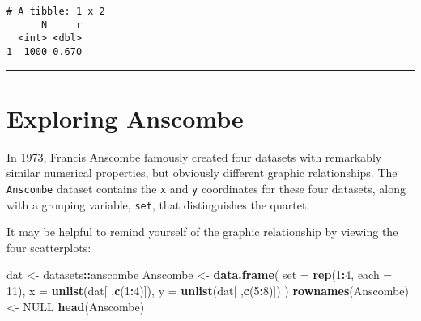 \documentclass[
]{book}
\newenvironment{Shaded}{\begin{snugshade}}{\end{snugshade}}
\newcommand{\CommentTok}[1]{\textcolor[rgb]{0.56,0.35,0.01}{\textit{#1}}}
\newcommand{\DataTypeTok}[1]{\textcolor[rgb]{0.13,0.29,0.53}{#1}}
\newcommand{\DecValTok}[1]{\textcolor[rgb]{0.00,0.00,0.81}{#1}}
\newcommand{\KeywordTok}[1]{\textcolor[rgb]{0.13,0.29,0.53}{\textbf{#1}}}
\newcommand{\NormalTok}[1]{#1}
\newcommand{\OperatorTok}[1]{\textcolor[rgb]{0.81,0.36,0.00}{\textbf{#1}}}
\newcommand{\OtherTok}[1]{\textcolor[rgb]{0.56,0.35,0.01}{#1}}
\newcommand{\StringTok}[1]{\textcolor[rgb]{0.31,0.60,0.02}{#1}}
\begin{document}
\begin{Shaded}
\end{Shaded}

\begin{verbatim}
# A tibble: 1 x 2
      N     r
  <int> <dbl>
1  1000 0.670
\end{verbatim}

\begin{center}\rule{0.5\linewidth}{0.5pt}\end{center}

\hypertarget{exploring-anscombe}{%
\section{Exploring Anscombe}\label{exploring-anscombe}}

In 1973, Francis Anscombe famously created four datasets with remarkably similar numerical properties, but obviously different graphic relationships. The \texttt{Anscombe} dataset contains the \texttt{x} and \texttt{y} coordinates for these four datasets, along with a grouping variable, \texttt{set}, that distinguishes the quartet.

It may be helpful to remind yourself of the graphic relationship by viewing the four scatterplots:

\begin{Shaded}
\begin{Highlighting}[]
\NormalTok{dat <-}\StringTok{ }\NormalTok{datasets}\OperatorTok{::}\NormalTok{anscombe}
\NormalTok{Anscombe <-}\StringTok{ }\KeywordTok{data.frame}\NormalTok{(}
    \DataTypeTok{set  =} \KeywordTok{rep}\NormalTok{(}\DecValTok{1}\OperatorTok{:}\DecValTok{4}\NormalTok{, }\DataTypeTok{each =} \DecValTok{11}\NormalTok{),}
    \DataTypeTok{x =} \KeywordTok{unlist}\NormalTok{(dat[ ,}\KeywordTok{c}\NormalTok{(}\DecValTok{1}\OperatorTok{:}\DecValTok{4}\NormalTok{)]),}
    \DataTypeTok{y =} \KeywordTok{unlist}\NormalTok{(dat[ ,}\KeywordTok{c}\NormalTok{(}\DecValTok{5}\OperatorTok{:}\DecValTok{8}\NormalTok{)])}
\NormalTok{    )}
\KeywordTok{rownames}\NormalTok{(Anscombe) <-}\StringTok{ }\OtherTok{NULL}
\KeywordTok{head}\NormalTok{(Anscombe)}
\end{Highlighting}
\end{Shaded}
\end{document}
